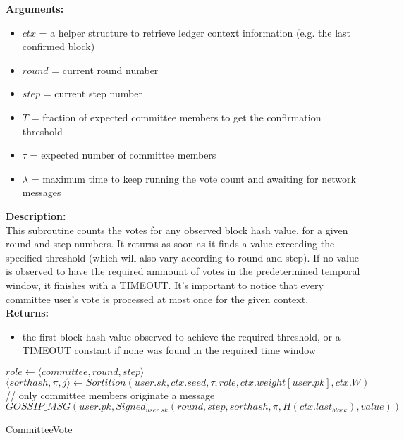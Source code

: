 \documentclass[10pt,a4paper]{article}
\begin{document}
\noindent \textbf{Arguments:}
\begin{itemize}
    \item $ctx$ = a helper structure to retrieve ledger context information (e.g. the last confirmed block)
    \item $round$ = current round number
    \item $step$ = current step number
    \item $T$ = fraction of expected committee members to get the confirmation threshold
    \item $\tau$ = expected number of committee members
    \item $\lambda$ = maximum time to keep running the vote count and awaiting for network messages
  \end{itemize}

\noindent \textbf{Description:}\\
This subroutine counts the votes for any observed block hash value, for a given round and step numbers.
It returns as soon as it finds a value exceeding the specified threshold (which will also vary according to round and step).
If no value is observed to have the required ammount of votes in the predetermined temporal window, it finishes with a TIMEOUT.
It's important to notice that every committee user's vote is processed at most once for the given context.\\

\noindent \textbf{Returns:}
\begin{itemize}
    \item the first block hash value observed to achieve the required threshold, or a TIMEOUT constant if none was found in the
    required time window
  \end{itemize}

\begin{algorithm}[H]
    \begin{algorithmic}[H]
    \State $role \gets \langle {committee},round,step\rangle$
    \State $\langle sorthash,\pi,j\rangle \gets Sortition(user.sk,ctx.seed,\tau ,role,ctx.weight[user.pk],ctx.W)$
    // only committee members originate a message
        \State $GOSSIP\_MSG(user.pk, Signed_{user.sk} (round,step,sorthash,\pi,H(ctx.last_{block}),value))$
    \EndIf
    \EndFunction
    \end{algorithmic}
    \caption{\underline{CommitteeVote}}
\end{algorithm}
\end{document}

